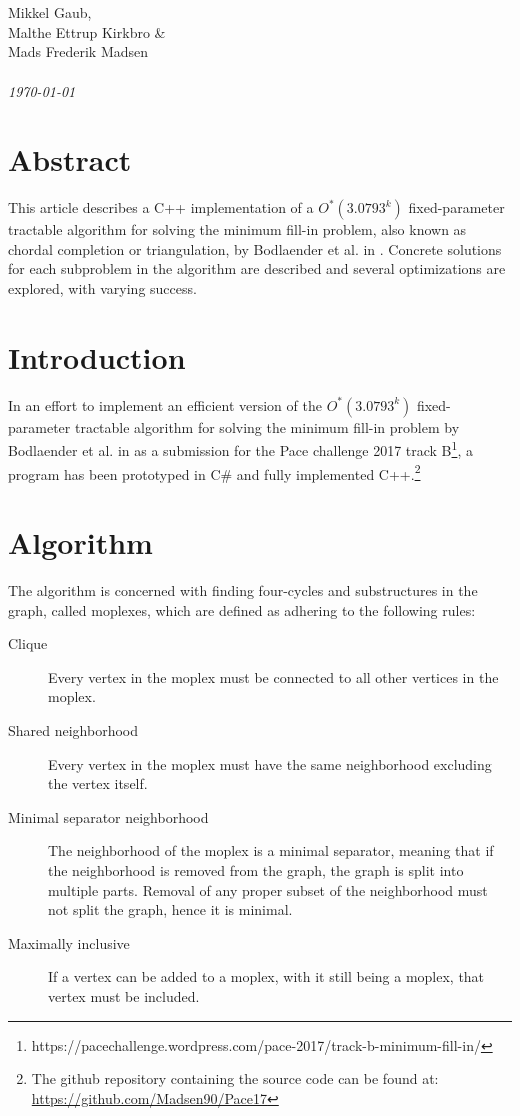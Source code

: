 \documentclass{article}
\begin{document}
\begin{titlepage}
		 \\ \\
		Mikkel Gaub, \\ Malthe Ettrup Kirkbro  \& \\ Mads Frederik Madsen	\\ \\
		\hspace{-18pt}
		\textit{\today}
		\thispagestyle{empty}
		\vspace{\fill}
		\section*{Abstract}
		This article describes a C++ implementation of a $O^*(3.0793^k)$ fixed-parameter tractable algorithm for solving the minimum fill-in problem, also known as chordal completion or triangulation, by Bodlaender et al. in \cite{algorithm}.
		Concrete solutions for each subproblem in the algorithm are described and several optimizations are explored, with varying success.
	\end{titlepage}
	\clearpage

	\section{Introduction}
	In an effort to implement an efficient version of the $O^*(3.0793^k)$ fixed-parameter tractable algorithm for solving the minimum fill-in problem by Bodlaender et al. in \cite[section 4]{algorithm} as a submission for the Pace challenge 2017 track B\footnote{https://pacechallenge.wordpress.com/pace-2017/track-b-minimum-fill-in/}, a program has been prototyped in C\# and fully implemented C++.\footnote{The github repository containing the source code can be found at: \url{https://github.com/Madsen90/Pace17}}

	\section{Algorithm}
	The algorithm is concerned with finding four-cycles and substructures in the graph, called moplexes, which are defined as adhering to the following rules: \\

	\begin{description}
		\item[Clique] Every vertex in the moplex must be connected to all other vertices in the moplex.
		\item[Shared neighborhood] Every vertex in the moplex must have the same neighborhood excluding the vertex itself.
		\item[Minimal separator neighborhood] The neighborhood of the moplex is a minimal separator, meaning that if the neighborhood is removed from the graph, the graph is split into multiple parts. Removal of any proper subset of the neighborhood must not split the graph, hence it is minimal.
		\item[Maximally inclusive] If a vertex can be added to a moplex, with it still being a moplex, that vertex must be included.
	\end{description}
\end{document}
